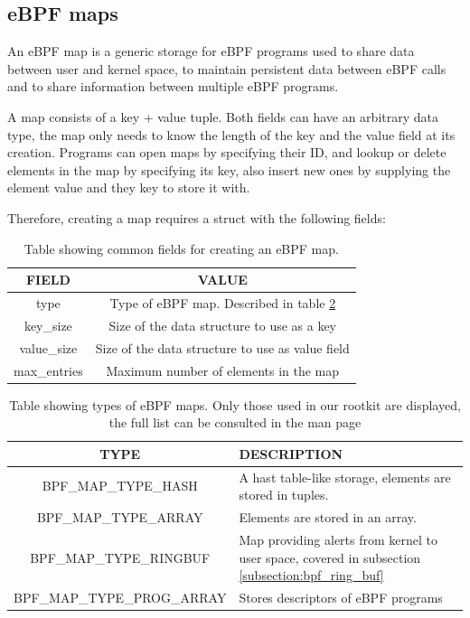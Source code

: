 \documentclass[12pt]{report} %
\begin{document}
\subsection{eBPF maps} \label{subsection:ebpf_maps}
An eBPF map is a generic storage for eBPF programs used to share data between user and kernel space, to maintain persistent data between eBPF calls and to share information between multiple eBPF programs\cite{ebpf_maps_kernel}.

A map consists of a key + value tuple. Both fields can have an arbitrary data type, the map only needs to know the length of the key and the value field at its creation\cite{bpf_syscall}. Programs can open maps by specifying their ID, and lookup or delete elements in the map by specifying its key, also insert new ones by supplying the element value and they key to store it with.

Therefore, creating a map requires a struct with the following fields:

\begin{table}[H]
\begin{tabular}{|c|c|}
\hline
FIELD & VALUE\\
\hline
type & Type of eBPF map. Described in table \ref{table:ebpf_map_types}\\
key\_size & Size of the data structure to use as a key\\
value\_size & Size of the data structure to use as value field\\
max\_entries & Maximum number of elements in the map\\
\hline
\end{tabular}
\caption{Table showing common fields for creating an eBPF map.}
\label{table:ebpf_map_struct}
\end{table}

\begin{table}[H]
\begin{tabular}{|c|>{\centering\arraybackslash}p{10cm}|}
\hline
TYPE & DESCRIPTION\\
\hline
BPF\_MAP\_TYPE\_HASH & A hast table-like storage, elements are stored in tuples.\\
BPF\_MAP\_TYPE\_ARRAY & Elements are stored in an array.\\
BPF\_MAP\_TYPE\_RINGBUF & Map providing alerts from kernel to user space, covered in subsection \ref{subsection:bpf_ring_buf}\\
BPF\_MAP\_TYPE\_PROG\_ARRAY & Stores descriptors of eBPF programs\\
\hline
\hline
\end{tabular}
\caption{Table showing types of eBPF maps. Only those used in our rootkit are displayed, the full list can be consulted in the man page \cite{bpf_syscall}}
\label{table:ebpf_map_types}
\end{table}
\end{document}
